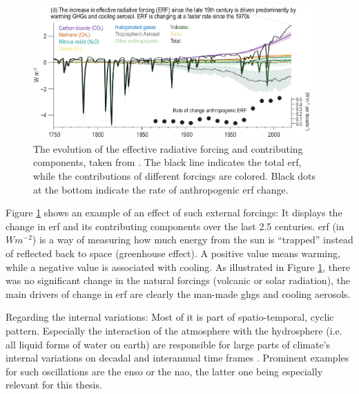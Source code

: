 \begin{figure}[htb]
  \begin{center}
    \includegraphics[width=0.95\textwidth]{figures/ERF_change_with_forcings.png}
  \end{center}
  \caption{The evolution of the effective radiative forcing and contributing components, taken from \cite{intergovernmental_panel_on_climate_change_ipcc_climate_2023}. The black line indicates the total \ac{erf}, while the contributions of different forcings are colored. Black dots at the bottom indicate the rate of anthropogenic \ac{erf} change.}
  \label{fig:erf-with-forcings}
\end{figure}

Figure \ref{fig:erf-with-forcings} shows an example of an effect of such external forcings: It displays the change in \ac{erf} and its contributing components over the last 2.5 centuries. 
\ac{erf} (in $Wm^{-2}$) is a way of measuring how much energy from the sun is \enquote{trapped} instead of reflected back to space (greenhouse effect). 
A positive value means warming, while a negative value is associated with cooling. 
As illustrated in  Figure \ref{fig:erf-with-forcings}, there was no significant change in the natural forcings (volcanic or solar radiation), the main drivers of change in \ac{erf} are clearly the man-made \acp{ghg} and cooling aerosols. \cite{intergovernmental_panel_on_climate_change_ipcc_climate_2023}

Regarding the internal variations: Most of it is part of spatio-temporal, cyclic pattern. Especially the interaction of the atmosphere with the hydrosphere (i.e. all liquid forms of water on earth) are responsible for large parts of climate's internal variations on decadal and interannual time frames \cite{vietinghoffdiss}. 
Prominent examples for such oscillations are the \ac{enso} or the \ac{nao}, the latter one being especially relevant for this thesis. 


